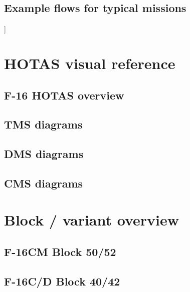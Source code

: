 \documentclass[11pt,a4paper]{article}
\begin{document}
\subsection{Example flows for typical missions}

]

\section{HOTAS visual reference}
\subsection{F-16 HOTAS overview}



\subsection{TMS diagrams}



\subsection{DMS diagrams}



\subsection{CMS diagrams}



\appendix

\section{Block / variant overview}

\subsection{F-16CM Block 50/52}



\subsection{F-16C/D Block 40/42}
\end{document}
